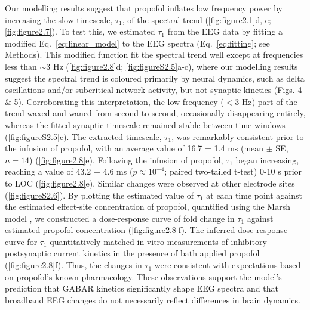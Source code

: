 Our modelling results suggest that propofol inflates low frequency power by increasing the slow timescale, $\tau_1$, of the spectral trend (\autoref{fig:figure2.1}d, e; \autoref{fig:figure2.7}). To test this, we estimated $\tau_1$ from the EEG data by fitting a modified Eq.~\ref{eq:linear_model} to the EEG spectra (Eq.~\ref{eq:fitting}; see Methods). This modified function fit the spectral trend well except at frequencies less than ${\sim}3$ \unit{\hertz} (\autoref{fig:figure2.8}d; \autoref{fig:figureS2.5}a-c), where our modelling results suggest the spectral trend is coloured primarily by neural dynamics, such as delta oscillations and/or subcritical network activity, but not synaptic kinetics (Figs. 4 \& 5). Corroborating this interpretation, the low frequency ($<3$ \unit{\hertz}) part of the trend waxed and waned from second to second, occasionally disappearing entirely, whereas the fitted synaptic timescale remained stable between time windows (\autoref{fig:figureS2.5}c). The extracted timescale, $\tau_1$, was remarkably consistent prior to the infusion of propofol, with an average value of 16.7 ± 1.4 ms (mean $\pm$ SE, $n=14$) (\autoref{fig:figure2.8}e). Following the infusion of propofol, $\tau_1$ began increasing, reaching a value of 43.2 $\pm$ 4.6 \unit{\milli\second} ($p \approx 10^{-4}$; paired two-tailed t-test) 0-10 \unit{\second} prior to LOC (\autoref{fig:figure2.8}e). Similar changes were observed at other electrode sites (\autoref{fig:figureS2.6}). By plotting the estimated value of $\tau_1$ at each time point against the estimated effect-site concentration of propofol, quantified using the Marsh model \cite{Marsh1991}, we constructed a dose-response curve of fold change in $\tau_1$ against estimated propofol concentration (\autoref{fig:figure2.8}f). The inferred dose-response curve for $\tau_1$ quantitatively matched in vitro measurements of inhibitory postsynaptic current kinetics in the presence of bath applied propofol \cite{Kitamura2003, Orser1994, Whittington1996} (\autoref{fig:figure2.8}f). Thus, the changes in $\tau_1$ were consistent with expectations based on propofol’s known pharmacology. These observations support the model’s prediction that GABAR kinetics significantly shape EEG spectra and that broadband EEG changes do not necessarily reflect differences in brain dynamics. 


